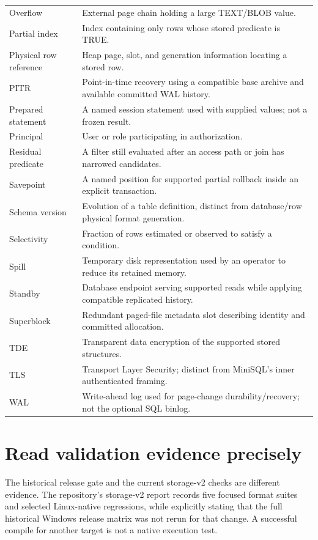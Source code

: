 \begin{longtable}{p{.25\linewidth}p{.66\linewidth}}
Overflow & External page chain holding a large TEXT/BLOB value. \\
Partial index & Index containing only rows whose stored predicate is TRUE. \\
Physical row reference & Heap page, slot, and generation information locating a stored row. \\
PITR & Point-in-time recovery using a compatible base archive and available committed WAL history. \\
Prepared statement & A named session statement used with supplied values; not a frozen result. \\
Principal & User or role participating in authorization. \\
Residual predicate & A filter still evaluated after an access path or join has narrowed candidates. \\
Savepoint & A named position for supported partial rollback inside an explicit transaction. \\
Schema version & Evolution of a table definition, distinct from database/row physical format generation. \\
Selectivity & Fraction of rows estimated or observed to satisfy a condition. \\
Spill & Temporary disk representation used by an operator to reduce its retained memory. \\
Standby & Database endpoint serving supported reads while applying compatible replicated history. \\
Superblock & Redundant paged-file metadata slot describing identity and committed allocation. \\
TDE & Transparent data encryption of the supported stored structures. \\
TLS & Transport Layer Security; distinct from MiniSQL's inner authenticated framing. \\
WAL & Write-ahead log used for page-change durability/recovery; not the optional SQL binlog. \\
\bottomrule
\end{longtable}

\section{Read validation evidence precisely}

The historical release gate and the current storage-v2 checks are different evidence. The repository's storage-v2 report records five focused format suites and selected Linux-native regressions, while explicitly stating that the full historical Windows release matrix was not rerun for that change. A successful compile for another target is not a native execution test.

